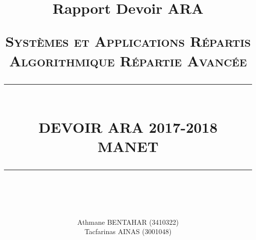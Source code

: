 \documentclass[10pt]{report}
\title{Rapport Devoir ARA}															%
\newcommand{\HRule}[1]{\rule{\linewidth}{#1}}										%
\begin{document}
\title{
\normalsize \textsc{\LARGE {Systèmes et Applications Répartis}\\\Large{Algorithmique Répartie Avancée}}
		\\ [2.0cm]
		\HRule{2pt} \\
		\LARGE \textbf{\uppercase{Devoir ARA 2017-2018\\MANET}}
		\HRule{2pt} \\ [0.5cm]
		\normalsize \vspace*{5\baselineskip}}

\author{
		Athmane BENTAHAR (3410322)\\Tacfarinas AINAS (3001048)\vspace{1in}}

\end{document}

